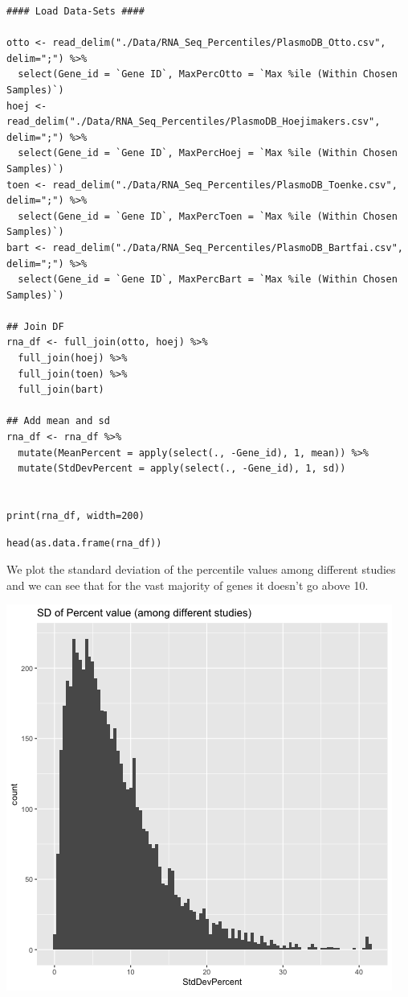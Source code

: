 \documentclass[11pt]{article}
\begin{document}
\begin{verbatim}
#### Load Data-Sets ####

otto <- read_delim("./Data/RNA_Seq_Percentiles/PlasmoDB_Otto.csv", delim=";") %>%
  select(Gene_id = `Gene ID`, MaxPercOtto = `Max %ile (Within Chosen Samples)`)
hoej <- read_delim("./Data/RNA_Seq_Percentiles/PlasmoDB_Hoejimakers.csv", delim=";") %>%
  select(Gene_id = `Gene ID`, MaxPercHoej = `Max %ile (Within Chosen Samples)`)
toen <- read_delim("./Data/RNA_Seq_Percentiles/PlasmoDB_Toenke.csv", delim=";") %>%
  select(Gene_id = `Gene ID`, MaxPercToen = `Max %ile (Within Chosen Samples)`)
bart <- read_delim("./Data/RNA_Seq_Percentiles/PlasmoDB_Bartfai.csv", delim=";") %>%
  select(Gene_id = `Gene ID`, MaxPercBart = `Max %ile (Within Chosen Samples)`)

## Join DF
rna_df <- full_join(otto, hoej) %>%
  full_join(hoej) %>%
  full_join(toen) %>%
  full_join(bart)

## Add mean and sd
rna_df <- rna_df %>%
  mutate(MeanPercent = apply(select(., -Gene_id), 1, mean)) %>%
  mutate(StdDevPercent = apply(select(., -Gene_id), 1, sd))


print(rna_df, width=200)
\end{verbatim}

\begin{verbatim}
head(as.data.frame(rna_df))
\end{verbatim}

We plot the standard deviation of the percentile values among different studies and we can see that for the vast majority of genes it doesn't go above 10.
\begin{center}
\includegraphics[width=.9\linewidth]{./Plots/rnaseq_perc_sd.png}
\end{center}
\end{document}
